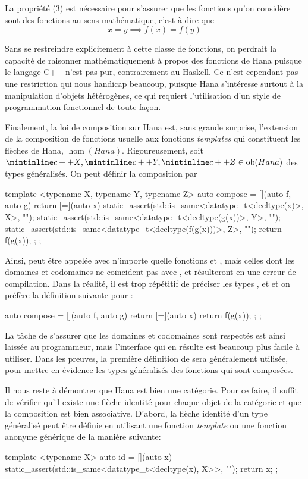 La propriété (3) est nécessaire pour s'assurer que les fonctions qu'on
considère sont des fonctions au sens mathématique, c'est-à-dire que
\[
    x = y \implies f(x) = f(y)
\]

Sans se restreindre explicitement à cette classe de fonctions, on perdrait la
capacité de raisonner mathématiquement à propos des fonctions de Hana puisque
le langage C++ n'est pas pur, contrairement au Haskell. Ce n'est cependant pas
une restriction qui nous handicap beaucoup, puisque Hana s'intéresse surtout à
la manipulation d'objets hétérogènes, ce qui requiert l'utilisation d'un style
de programmation fonctionnel de toute façon.

Finalement, la loi de composition sur Hana est, sans grande surprise,
l'extension de la composition de fonctions usuelle aux fonctions
\textit{templates} qui constituent les flèches de Hana, $\hom(Hana)$.
Rigoureusement, soit $\icpp{X}, \icpp{Y}, \icpp{Z} \in \ob(Hana)$ des
types généralisés. On peut définir la composition par
\begin{cpp}
    template <typename X, typename Y, typename Z>
    auto compose = [](auto f, auto g) {
        return [=](auto x) {
            static_assert(std::is_same<datatype_t<decltype(x)>, X>{}, "");
            static_assert(std::is_same<datatype_t<decltype(g(x))>, Y>{}, "");
            static_assert(std::is_same<datatype_t<decltype(f(g(x)))>, Z>{}, "");
            return f(g(x));
        };
    };
\end{cpp}

Ainsi,  peut être appelée avec n'importe quelle fonctions
 et , mais celles dont les domaines et codomaines ne coïncident
pas avec ,  et  résulteront en une erreur de compilation.
Dans la réalité, il est trop répétitif de préciser les types ,  et
 et on préfère la définition suivante pour :
\begin{cpp}
    auto compose = [](auto f, auto g) {
        return [=](auto x) {
            return f(g(x));
        };
    };
\end{cpp}

La tâche de s'assurer que les domaines et codomaines sont respectés est ainsi
laissée au programmeur, mais l'interface qui en résulte est beaucoup plus
facile à utiliser. Dans les preuves, la première définition de 
sera généralement utilisée, pour mettre en évidence les types généralisés des
fonctions qui sont composées.

Il nous reste à démontrer que Hana est bien une catégorie. Pour ce faire,
il suffit de vérifier qu'il existe une flèche identité pour chaque objet de
la catégorie et que la composition est bien associative. D'abord, la flèche
identité d'un type généralisé peut être définie en utilisant une fonction
\textit{template} ou une fonction anonyme générique de la manière suivante:
\begin{cpp}
    template <typename X>
    auto id = [](auto x) {
        static_assert(std::is_same<datatype_t<decltype(x), X>>{}, "");
        return x;
    };
\end{cpp}

